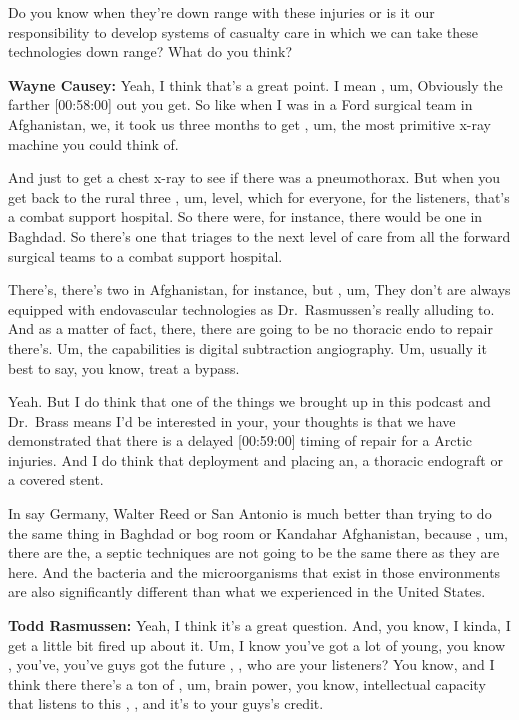 \documentclass[
]{book}
\begin{document}
Do you know when they're down range with these injuries or is it our
responsibility to develop systems of casualty care in which we can take
these technologies down range? What do you think?

\textbf{Wayne Causey:} Yeah, I think that's a great point. I mean , um,
Obviously the farther {[}00:58:00{]} out you get. So like when I was in a
Ford surgical team in Afghanistan, we, it took us three months to get ,
um, the most primitive x-ray machine you could think of.

And just to get a chest x-ray to see if there was a pneumothorax. But
when you get back to the rural three , um, level, which for everyone,
for the listeners, that's a combat support hospital. So there were, for
instance, there would be one in Baghdad. So there's one that triages to
the next level of care from all the forward surgical teams to a combat
support hospital.

There's, there's two in Afghanistan, for instance, but , um, They don't
are always equipped with endovascular technologies as Dr.~Rasmussen's
really alluding to. And as a matter of fact, there, there are going to
be no thoracic endo to repair there's. Um, the capabilities is digital
subtraction angiography. Um, usually it best to say, you know, treat a
bypass.

Yeah. But I do think that one of the things we brought up in this
podcast and Dr.~Brass means I'd be interested in your, your thoughts is
that we have demonstrated that there is a delayed {[}00:59:00{]} timing of
repair for a Arctic injuries. And I do think that deployment and placing
an, a thoracic endograft or a covered stent.

In say Germany, Walter Reed or San Antonio is much better than trying to
do the same thing in Baghdad or bog room or Kandahar Afghanistan,
because , um, there are the, a septic techniques are not going to be the
same there as they are here. And the bacteria and the microorganisms
that exist in those environments are also significantly different than
what we experienced in the United States.

\textbf{Todd Rasmussen:} Yeah, I think it's a great question. And, you know,
I kinda, I get a little bit fired up about it. Um, I know you've got a
lot of young, you know , you've, you've guys got the future , , who are
your listeners? You know, and I think there there's a ton of , um, brain
power, you know, intellectual capacity that listens to this , , and it's
to your guys's credit.
\end{document}
